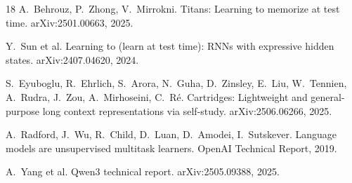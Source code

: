 \documentclass[11pt]{article}
\begin{document}
\begin{thebibliography}{18}
 A.~Behrouz, P.~Zhong, V.~Mirrokni. Titans: Learning to memorize at test time. arXiv:2501.00663, 2025.

 Y.~Sun et al. Learning to (learn at test time): RNNs with expressive hidden states. arXiv:2407.04620, 2024.

 S.~Eyuboglu, R.~Ehrlich, S.~Arora, N.~Guha, D.~Zinsley, E.~Liu, W.~Tennien, A.~Rudra, J.~Zou, A.~Mirhoseini, C.~R\'e. Cartridges: Lightweight and general-purpose long context representations via self-study. arXiv:2506.06266, 2025.

 A.~Radford, J.~Wu, R.~Child, D.~Luan, D.~Amodei, I.~Sutskever. Language models are unsupervised multitask learners. OpenAI Technical Report, 2019.

 A.~Yang et al. Qwen3 technical report. arXiv:2505.09388, 2025.

\end{thebibliography}
\end{document}

